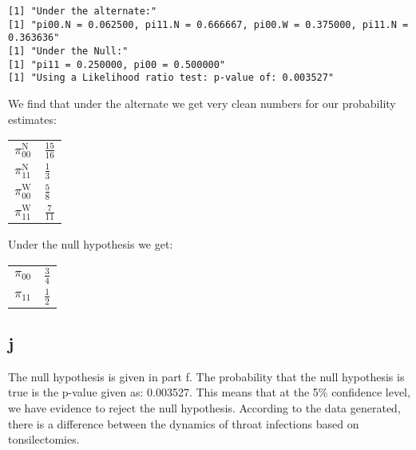 \documentclass[11pt]{article}
\begin{document}
\begin{verbatim}
[1] "Under the alternate:"
[1] "pi00.N = 0.062500, pi11.N = 0.666667, pi00.W = 0.375000, pi11.N = 0.363636"
[1] "Under the Null:"
[1] "pi11 = 0.250000, pi00 = 0.500000"
[1] "Using a Likelihood ratio test: p-value of: 0.003527"
\end{verbatim}

We find that under the alternate we get very clean numbers for our
probability estimates: 
\begin{center}
\begin{tabular}{ll}
$\pi$$_{\text{00}}^{\text{N}}$ & $\frac{15}{16}$\\
$\pi$$_{\text{11}}^{\text{N}}$ & $\frac{1}{3}$\\
$\pi$$_{\text{00}}^{\text{W}}$ & $\frac{5}{8}$\\
$\pi$$_{\text{11}}^{\text{W}}$ & $\frac{7}{11}$\\
\end{tabular}
\end{center}

Under the null hypothesis we get:
\begin{center}
\begin{tabular}{ll}
$\pi$$_{\text{00}}$ & $\frac{3}{4}$\\
$\pi$$_{\text{11}}$ & $\frac{1}{2}$\\
\end{tabular}
\end{center}

\subsection{j}
\label{sec-1-10}
The null hypothesis is given in part f. The probability that the null
hypothesis is true is the p-value given as: 0.003527. This means that
at the 5\% confidence level, we have evidence to reject the null
hypothesis. According to the data generated, there is a difference
between the dynamics of throat infections based on tonsilectomies.
\end{document}
